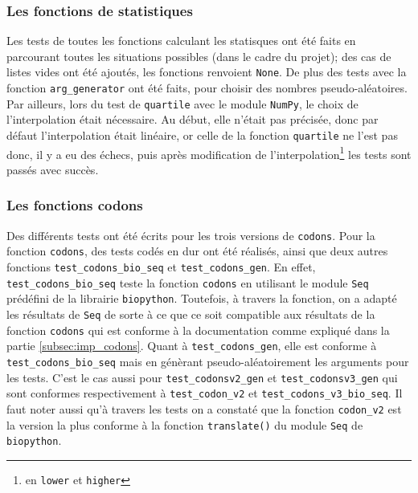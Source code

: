 \documentclass[12pt]{article}
\begin{document}
\subsubsection{Les fonctions de statistiques}
Les tests de toutes les fonctions calculant les statisques ont été faits en parcourant toutes les situations possibles (dans le cadre du projet); des cas de listes vides ont été ajoutés, les fonctions renvoient \texttt{None}. De plus des tests avec la fonction \texttt{arg\_generator} ont été faits, pour choisir des nombres pseudo-aléatoires. Par ailleurs, lors du test de \texttt{quartile} avec le module \texttt{NumPy}, le choix de l'interpolation était nécessaire. Au début, elle n'était pas précisée, donc par défaut l'interpolation était linéaire, or celle de la fonction \texttt{quartile} ne l'est pas donc, il y a eu des échecs, puis après modification de l'interpolation\footnote{en \texttt{lower} et \texttt{higher}} les tests sont passés avec succès.



\subsubsection{Les fonctions codons}
Des différents tests ont été écrits pour les trois versions de \texttt{codons}. 
Pour la fonction \texttt{codons}, des tests codés en dur ont été réalisés, ainsi que deux autres fonctions \texttt{test\_codons\_bio\_seq} et \texttt{test\_codons\_gen}. En effet, \texttt{test\_codons\_bio\_seq} teste la fonction \texttt{codons} en utilisant le module \texttt{Seq}  prédéfini de la librairie \texttt{biopython}. Toutefois, à travers la fonction, on a adapté les résultats de \texttt{Seq} de sorte à ce que ce soit compatible aux résultats de la fonction \texttt{codons} qui est conforme à la documentation comme expliqué dans la partie \ref{subsec:imp_codons}.
Quant à \texttt{test\_codons\_gen}, elle est conforme à \texttt{test\_codons\_bio\_seq} mais en génèrant pseudo-aléatoirement les arguments pour les tests.
C'est le cas aussi pour \texttt{test\_codonsv2\_gen} et \texttt{test\_codonsv3\_gen} qui sont conformes respectivement à \texttt{test\_codon\_v2} et \texttt{test\_codons\_v3\_bio\_seq}.
Il faut noter aussi qu'à travers les tests on a constaté que la fonction \texttt{codon\_v2} est la version la plus conforme à la fonction \texttt{translate()} du module \texttt{Seq} de \texttt{biopython}.
\end{document}
